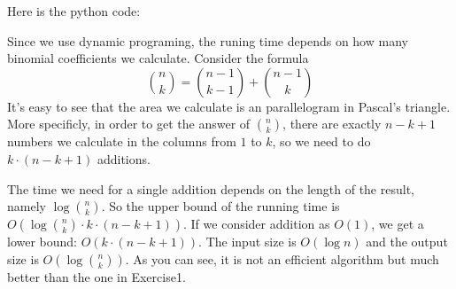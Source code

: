 Here is the python code:


Since we use dynamic programing, the runing time depends on how many binomial coefficients we calculate.
Consider the formula
\[\binom{n}{k}=\binom{n-1}{k-1}+\binom{n-1}{k}\]
It's easy to see that the area we calculate is an parallelogram in Pascal's triangle.
More specificly, in order to get the answer of $\binom{n}{k}$, there are exactly $n-k+1$ numbers we calculate in the columns from $1$ to $k$,
so we need to do $k\cdot (n-k+1)$ additions.\par
The time we need for a single addition depends on the length of the result, namely $\log \binom{n}{k}$.
So the upper bound of the running time is $O(\log \binom{n}{k}\cdot k\cdot (n-k+1))$. If we consider addition as $O(1)$, we get a lower bound: $O(k\cdot (n-k+1))$.
The input size is $O(\log n)$ and the output size is $O(\log \binom{n}{k})$. As you can see, it is not an efficient algorithm but much better than the one in Exercise1.
